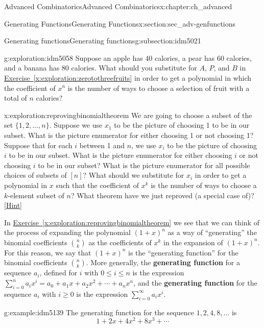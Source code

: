 \documentclass[oneside,10pt,]{book}
\newcommand{\terminology}[1]{\textbf{#1}}
\numberwithin{equation}{chapter}
\begin{document}
\begin{chapterptx}{Advanced Combinatorics}{}{Advanced Combinatorics}{}{}{x:chapter:ch_advanced}
\begin{sectionptx}{Generating Functions}{}{Generating Functions}{}{}{x:section:sec_adv-genfunctions}
\begin{subsectionptx}{Generating functions}{}{Generating functions}{}{}{g:subsection:idm5021}
\begin{exploration}{}{g:exploration:idm5058}%
Suppose an apple has 40 calories, a pear has 60 calories, and a banana has 80 calories. What should you substitute for \(A\), \(P\), and \(B\) in \hyperref[x:exploration:zerotothreefruits]{Exercise~\ref{x:exploration:zerotothreefruits}} in order to get a polynomial in which the coefficient of \(x^n\) is the number of ways to choose a selection of fruit with a total of \(n\) calories?%
\end{exploration}
\begin{exploration}{}{x:exploration:reprovingbinomialtheorem}%
We are going to choose a subset of the set \(\{1,2,\ldots, n\}\). Suppose we use \(x_1\) to be the picture of choosing 1 to be in our subset. What is the picture enumerator for either choosing 1 or not choosing 1? Suppose that for each \(i\) between 1 and \(n\), we use \(x_i\) to be the picture of choosing \(i\) to be in our subset. What is the picture enumerator for either choosing \(i\) or not choosing \(i\) to be in our subset? What is the picture enumerator for all possible choices of subsets of \([n]\)? What should we substitute for \(x_i\) in order to get a polynomial in \(x\) such that the coefficient of \(x^k\) is the number of ways to choose a \(k\)-element subset of \(n\)? What theorem have we just reproved (a special case of)?%
\space\hspace*{0pt}\hfill{\tiny\hyperlink{g:hint:idm5092-back}{[Hint]}}\end{exploration}
In \hyperref[x:exploration:reprovingbinomialtheorem]{Exercise~\ref{x:exploration:reprovingbinomialtheorem}} we see that we can think of the process of expanding the polynomial \((1+x)^n\) as a way of ``generating'' the binomial coefficients \(\binom{n}{k}\) as the coefficients of \(x^k\) in the expansion of \((1+x)^n\). For this reason, we say that \((1+x)^n\) is the ``generating function'' for the binomial coefficients \(\binom{n}{k}\). More generally, the \terminology{generating function} for a sequence \(a_i\), defined for \(i\) with \(0\le i\le n\) is the expression \(\sum_{i=0}^n a_ix^i = a_0 + a_1x + a_2x^2 + \cdots + a_nx^n\), and the \terminology{generating function} for the sequence \(a_i\) with \(i\ge 0\) is the expression \(\sum_{i=0}^\infty a_ix^i\).%
\begin{example}{}{g:example:idm5139}%
The generating function for the sequence \(1, 2, 4, 8, \ldots\) is%
\begin{equation*}
1 + 2x + 4x^2 + 8x^3 + \cdots
\end{equation*}

\end{example}
\end{subsectionptx}
\end{sectionptx}
\end{chapterptx}
\end{document}
